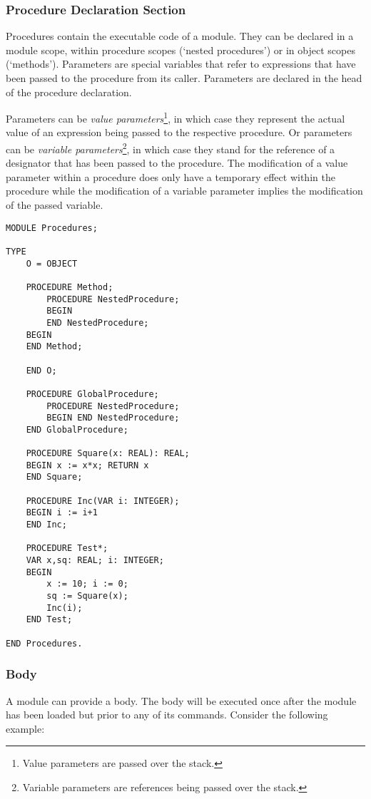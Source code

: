 \documentclass[a4paper,11pt]{article}
\begin{document}
\subsubsection{Procedure Declaration Section}\label{section:ProcedureDeclarationSection}
Procedures contain the executable code of a module. They can be declared in a module scope, within procedure scopes (`nested procedures') or in object scopes (`methods'). Parameters are special variables that refer to expressions that have been passed to the procedure from its caller. Parameters are declared in the head of the procedure declaration.

Parameters can be {\em value parameters}\footnote{Value parameters are passed over the stack.}, in which case they represent the actual value of an expression being passed to the respective procedure. Or parameters can be {\em variable parameters}\footnote{Variable parameters are references being passed over the stack.}, in which case they stand for the reference of a designator that has been passed to the procedure. The modification of a value parameter within a procedure does only have a temporary effect within the procedure while the modification of a variable parameter implies the modification of the passed variable.

\begin{lstlisting}[language=Oberon,frame=none,caption={Procedures}]
MODULE Procedures;

TYPE
    O = OBJECT

    PROCEDURE Method;
        PROCEDURE NestedProcedure;
        BEGIN
        END NestedProcedure;
    BEGIN
    END Method;

    END O;

    PROCEDURE GlobalProcedure;
        PROCEDURE NestedProcedure;
        BEGIN END NestedProcedure;
    END GlobalProcedure;

    PROCEDURE Square(x: REAL): REAL;
    BEGIN x := x*x; RETURN x
    END Square;

    PROCEDURE Inc(VAR i: INTEGER);
    BEGIN i := i+1
    END Inc;

    PROCEDURE Test*;
    VAR x,sq: REAL; i: INTEGER;
    BEGIN
        x := 10; i := 0;
        sq := Square(x);
        Inc(i);
    END Test;

END Procedures.
\end{lstlisting}

\subsubsection{Body}
A module can provide a body. The body will be executed once after the module has been loaded but prior to any of its commands.
Consider the following example:
\end{document}
